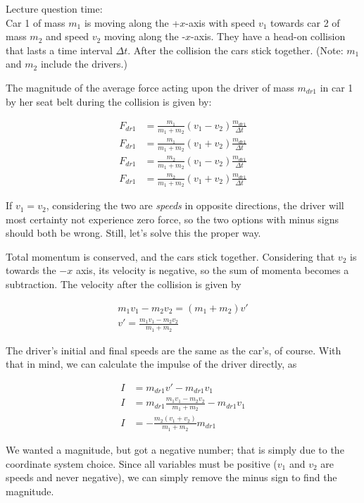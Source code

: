 Lecture question time:\\
Car 1 of mass $m_1$ is moving along the +$x$-axis with speed $v_1$ towards car 2 of mass $m_2$ and speed $v_2$ moving along the -$x$-axis. They have a head-on collision that lasts a time interval $\Delta t$. After the collision the cars stick together. (Note: $m_1$ and $m_2$ include the drivers.)

The magnitude of the average force acting upon the driver of mass $m_{dr1}$ in car 1 by her seat belt during the collision is given by:

\begin{align}
F_{dr1} &= \frac{m_1}{m_1 + m_2} (v_1 - v_2) \frac{m_{dr1}}{\Delta t}\\
F_{dr1} &= \frac{m_1}{m_1 + m_2} (v_1 + v_2) \frac{m_{dr1}}{\Delta t}\\
F_{dr1} &= \frac{m_2}{m_1 + m_2} (v_1 - v_2) \frac{m_{dr1}}{\Delta t}\\
F_{dr1} &= \frac{m_2}{m_1 + m_2} (v_1 + v_2) \frac{m_{dr1}}{\Delta t}
\end{align}

If $v_1 = v_2$, considering the two are \emph{speeds} in opposite directions, the driver will most certainty not experience zero force, so the two options with minus signs should both be wrong. Still, let's solve this the proper way.

Total momentum is conserved, and the cars stick together. Considering that $v_2$ is towards the $-x$ axis, its velocity is negative, so the sum of momenta becomes a subtraction. The velocity after the collision is given by

\begin{align}
m_1 v_1 - m_2 v_2 = (m_1 + m_2) v'\\
v' = \frac{m_1 v_1 - m_2 v_2}{m_1 + m_2}
\end{align}

The driver's initial and final speeds are the same as the car's, of course. With that in mind, we can calculate the impulse of the driver directly, as

\begin{align}
I &= m_{dr1} v' - m_{dr1} v_1\\
I &= m_{dr1}  \frac{m_1 v_1 - m_2 v_2}{m_1 + m_2} - m_{dr1} v_1\\
I &= - \frac{m_2(v_1 + v_2)}{m_1 + m_2} m_{dr1}
\end{align}

We wanted a magnitude, but got a negative number; that is simply due to the coordinate system choice. Since all variables must be positive ($v_1$ and $v_2$ are speeds and never negative), we can simply remove the minus sign to find the magnitude.

